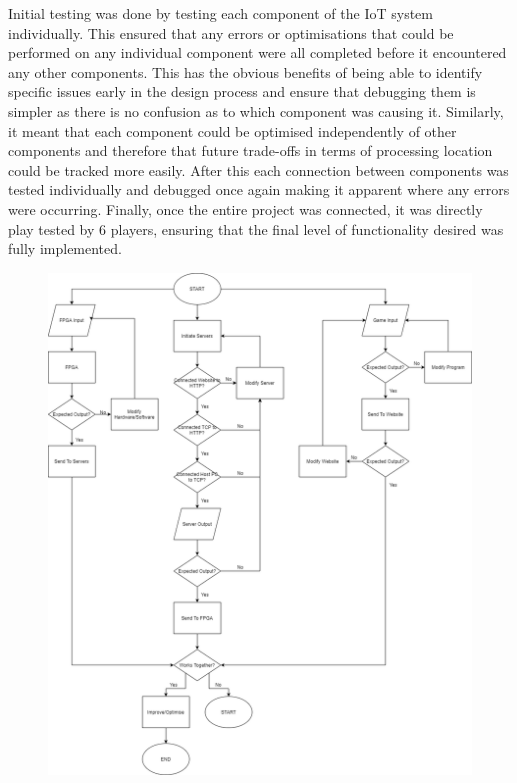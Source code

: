 \documentclass[12pt,a4paper]{article}
\begin{document}
Initial testing was done by testing each component of the IoT system individually. 
This ensured that any errors or optimisations that could be performed on any 
individual component were all completed before it encountered any other components. 
This has the obvious benefits of being able to identify specific issues early in 
the design process and ensure that debugging them is simpler as there is no confusion 
as to which component was causing it. Similarly, it meant that each component could 
be optimised independently of other components and therefore that future trade-offs 
in terms of processing location could be tracked more easily. After this each 
connection between components was tested individually and debugged once again making 
it apparent where any errors were occurring. Finally, once the entire project was 
connected, it was directly play tested by 6 players, ensuring that the final level 
of functionality desired was fully implemented. 
\begin{figure} [h!]
    \centering
    \includegraphics[scale = 0.25]{Flowchart.png}
\end{figure}
\end{document}
